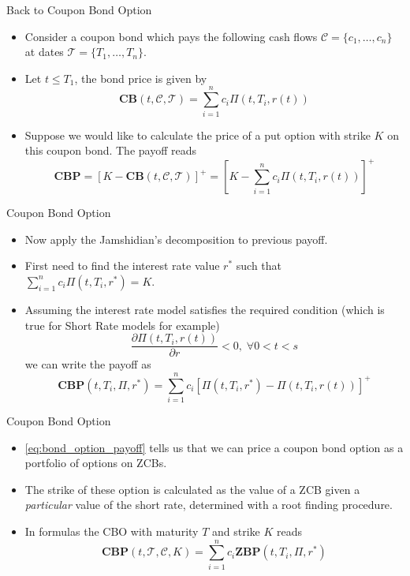\documentclass{beamer}
\begin{document}
\begin{frame}{Back to Coupon Bond Option}
\begin{itemize}
	\item<1-> Consider a coupon bond which pays the following cash flows $\mathcal{C}=\{c_1,\dots,c_n\}$ at dates $\mathcal{T}=\{T_1,\ldots,T_n\}$.
	\item<2-> Let $t\leq T_1$, the bond price is given by
	\begin{equation*}
		\textbf{CB}(t,\mathcal{C},\mathcal{T})=\sum_{i=1}^n c_i \Pi(t, T_i, r(t))
	\end{equation*}
	\item<3-> Suppose we would like to calculate the price of a put option with strike $K$ on this coupon bond. The payoff reads
	\begin{equation*}
		\textbf{CBP}=\left[K-\textbf{CB}(t,\mathcal{C},\mathcal{T})\right]^+ = \left[K-\sum_{i=1}^n c_i \Pi(t, T_i, r(t))\right]^+
	\end{equation*}
\end{itemize}
\end{frame}

\begin{frame}{Coupon Bond Option}
\begin{itemize}
	\item<1-> Now apply the Jamshidian's decomposition to previous payoff.
	\item<2-> First need to find the interest rate value $r^*$ such that $\sum_{i=1}^n c_i \Pi(t, T_i, r^*) = K$.
	\item<3-> Assuming the interest rate model satisfies the required condition (which is true for Short Rate models for example)
	\begin{equation*}
		\frac{\partial \Pi(t,T_i,r(t))}{\partial r}<0,\;\forall 0<t<s
	\end{equation*}
	we can write the payoff as
	\begin{equation}
		\textbf{CBP}(t,T_i,\Pi,r^*) = \sum_{i=1}^n c_i [\Pi(t, T_i, r^*)-\Pi(t, T_i, r(t))]^+
	\label{eq:bond_option_payoff}
	\end{equation}
\end{itemize}
\end{frame}

\begin{frame}{Coupon Bond Option}
\begin{itemize}
	\item \cref{eq:bond_option_payoff} tells us that we can price a coupon bond option as a portfolio of options on ZCBs.
	\item The strike of these option is calculated as the value of a ZCB given a \emph{particular} value of the short rate, determined with a root finding procedure.
	\item In formulas the CBO with maturity $T$ and strike $K$ reads
	\begin{equation}
		\boxed{\textbf{CBP}(t,\mathcal{T},\mathcal{C},K) = \sum_{i=1}^n c_i \textbf{ZBP}(t,T_i,\Pi,r^*)}
	\end{equation}
\end{itemize}
\end{frame}
\end{document}
